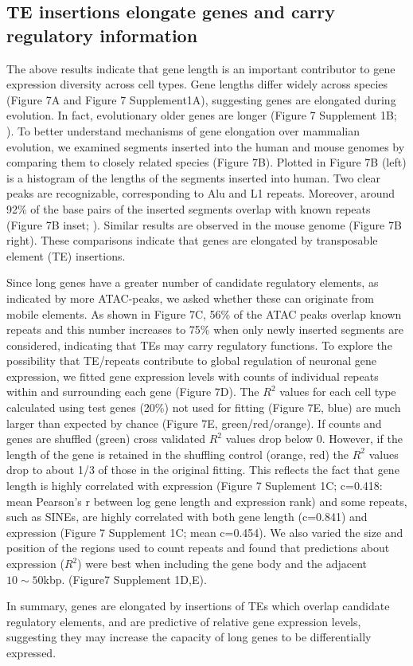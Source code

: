 \subsection{TE insertions elongate genes and carry regulatory information}

The above results indicate that gene length is an important contributor to gene expression diversity across cell types. Gene lengths differ widely across species (Figure 7A and Figure 7 Supplement1A), suggesting genes are elongated during evolution. In fact, evolutionary older genes are longer (Figure 7 Supplement 1B; \cite{Grishkevich_2014}). To better understand mechanisms of gene elongation over mammalian evolution, we examined segments inserted into the human and mouse genomes by comparing them to closely related species (Figure 7B). Plotted in Figure 7B (left) is a histogram of the lengths of the segments inserted into human. Two clear peaks are recognizable, corresponding to Alu and L1 repeats. Moreover, around 92\% of the base pairs of the inserted segments overlap with known repeats (Figure 7B inset; \cite{Bao_2015}). Similar results are observed in the mouse genome (Figure 7B right). These comparisons indicate that genes are elongated by transposable element (TE) insertions. 

Since long genes have a greater number of candidate regulatory elements, as indicated by more ATAC-peaks, we asked whether these can originate from mobile elements. As shown in Figure 7C, 56\% of the ATAC peaks overlap known repeats and this number increases to 75\% when only newly inserted segments are considered, indicating that TEs may carry regulatory functions. To explore the possibility that TE/repeats contribute to global regulation of neuronal gene expression, we fitted gene expression levels with counts of individual repeats within and surrounding each gene (Figure 7D).  The $R^2$ values for each cell type calculated using test genes (20\%) not used for fitting (Figure 7E, blue) are much larger than expected by chance (Figure 7E, green/red/orange). If counts and genes are shuffled (green) cross validated $R^2$ values drop below 0. However, if the length of the gene is retained in the shuffling control (orange, red) the $R^2$ values drop to about 1/3 of those in the original fitting. This reflects the fact that gene length is highly correlated with expression (Figure 7 Suplement 1C; c=0.418: mean Pearson's r between log gene length and expression rank) and some repeats, such as SINEs, are highly correlated with both gene length (c=0.841) and expression (Figure 7 Supplement 1C; mean c=0.454). We also varied the size and position of the regions used to count repeats and found that predictions about expression ($R^2$) were best when including the gene body and the adjacent $10\sim 50$kbp. (Figure7 Supplement 1D,E). 

In summary, genes are elongated by insertions of TEs which overlap candidate regulatory elements, and are predictive of relative gene expression levels, suggesting they may increase the capacity of long genes to be differentially expressed. 


